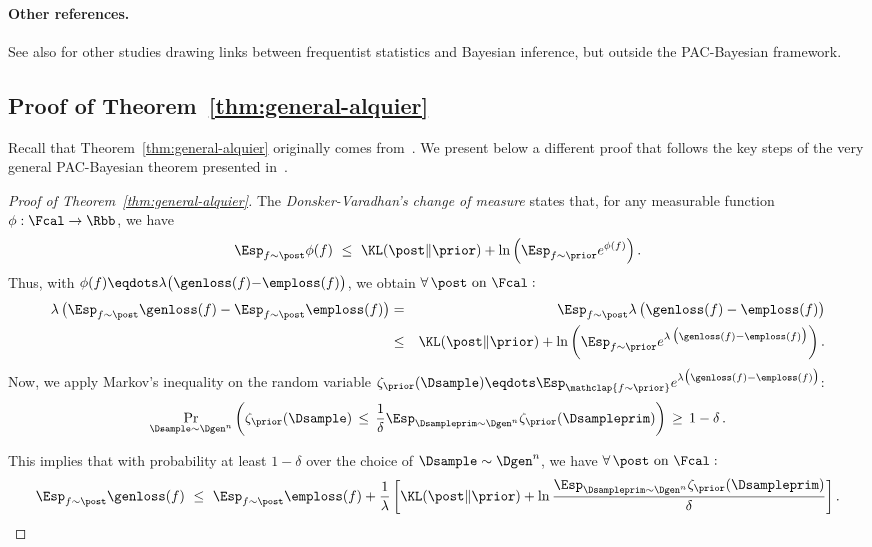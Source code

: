 \documentclass{article}
\theoremstyle{definition}
\theoremstyle{plain}
\newcommand{\citetA}{\citet}
\begin{document}
\paragraph{Other references.}
See also \citetA{grunwald-07,lacostejulien-11,meir-03,ng-01,rousseau-16} for other studies drawing links between frequentist statistics and Bayesian inference, but outside the PAC-Bayesian framework.

\subsection{Proof of Theorem~\ref{thm:general-alquier}}
\label{appendix:pacbayes_proofs}

%

Recall that Theorem~\ref{thm:general-alquier} originally comes from~\citet[Theorem 4.1]{alquier-15}. We present below a different proof that follows the key steps of the very general PAC-Bayesian theorem presented in~\citetA[Theorem 4]{graal-aistats16}.

\begin{proof}[Proof of Theorem~\ref{thm:general-alquier}]
	 The \emph{Donsker-Varadhan's change of measure} states that, for any measurable function $\phi:\Fcal\to\Rbb$, we have
	 \begin{equation} \label{eq:changeofmeasure}
	 \Esp_{f\sim\post} \phi(f) \ \leq\ \KL(\post\|\prior) + \ln\left(\Esp_{f\sim\prior}e^{\phi(f)}\right).
	 \end{equation}
	Thus, with
	$\phi(f){\eqdots} \lambda\big(\genloss(f){-}\emploss(f)\big)$, we obtain
	$\forall\, \post \mbox{ on }\Fcal :$
	\begin{eqnarray*}
		\lambda\, \big(	\Esp_{f\sim\post} \genloss(f)-	\Esp_{f\sim\post} \emploss(f)\big) %
		&=&
		\Esp_{f\sim \post} \lambda\, \big(\genloss(f)-\emploss(f)\big)
		\\
		&\leq&
		\KL(\post\|\prior) + \ln \bigg(
		\Esp_{f\sim \prior} e^{\lambda\, \big(\genloss(f)-\emploss(f)\big)}
		\bigg)\,.
	\end{eqnarray*}
	Now, we apply Markov's inequality on the random variable $\displaystyle\zeta_\prior(\Dsample) \eqdots \Esp_{\mathclap{f\sim \prior}} e^{\lambda \big(\genloss(f)-\emploss(f)\big)}$:
%
\begin{equation*}
		\Pr_{\Dsample\sim \Dgen^n} \left(
		\zeta_\prior(\Dsample)\,\le\,
		\frac{1}{\delta}\Esp_{{\Dsampleprim\sim \Dgen^n}}\zeta_\prior(\Dsampleprim)
		\right)\, \geq\, 1-\delta\,.
\end{equation*}

This  implies that with probability at least $1{-}\delta$ over the choice of $\Dsample\sim \Dgen^n$,
	we have
	$\forall\, \post \mbox{ on }\Fcal :$
	\begin{equation*}\label{eq:presque}
	\Esp_{f\sim\post} \genloss(f) \ \leq\ 	\Esp_{f\sim\post} \emploss(f) 
	+ \frac1\lambda\left[
	\KL(\post\|\prior) + \ln \frac{\displaystyle\Esp_{\Dsampleprim\sim \Dgen^n} \zeta_\prior(\Dsampleprim)}{\delta}
	\right].
	\end{equation*}
%
%
%
%
%
%
%
%
%
%
%
%
%
%
%
\end{proof}
\end{document}
